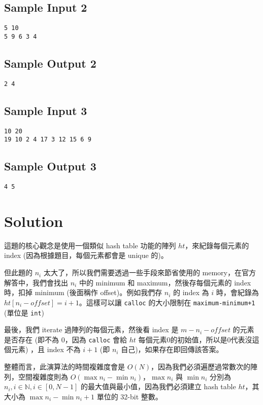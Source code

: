\documentclass[12pt]{article}
\begin{document}
\subsection{Sample Input 2}
\begin{verbatim}
5 10
5 9 6 3 4
\end{verbatim}
\subsection{Sample Output 2}
\begin{verbatim}    
2 4
\end{verbatim}
\subsection{Sample Input 3}
\begin{verbatim}
10 20
19 10 2 4 17 3 12 15 6 9
\end{verbatim}
\subsection{Sample Output 3}
\begin{verbatim}
4 5
\end{verbatim}
\section{Solution}
這題的核心觀念是使用一個類似 hash table 功能的陣列 $ht$，來紀錄每個元素的 index (因為根據題目，每個元素都會是 unique 的)。

但此題的 $n_i$ 太大了，所以我們需要透過一些手段來節省使用的 memory，在官方解答中，我們會找出 $n_i$ 中的 minimum 和 maximum，然後存每個元素的 index 時，扣掉 minimum (後面稱作 offset)。例如我們存 $n_i$ 的 index 為 $i$ 時，會紀錄為 $ht[n_i-offset]=i+1$。這樣可以讓 \texttt{calloc} 的大小限制在 \texttt{maximum-minimum+1} (單位是 \texttt{int})

最後，我們 iterate 過陣列的每個元素，然後看 index 是 $m-n_i-offset$ 的元素是否存在 (即不為 $0$，因為 \texttt{calloc} 會給 $ht$ 每個元素0的初始值，所以是0代表沒這個元素) ，且 index 不為 $i+1$ (即 $n_i$ 自己)，如果存在即回傳該答案。

整體而言，此演算法的時間複雜度會是 $O(N)$，因為我們必須遍歷過常數次的陣列，空間複雜度則為 $O(\max{n_i}-\min{n_i})$，$\max{n_i}$ 與 $\min{n_i}$ 分別為 $n_i,i\in\mathbb{N},i\in[0,N-1]$ 的最大值與最小值，因為我們必須建立 hash table $ht$，其大小為 $\max{n_i}-\min{n_i}+1$ 單位的 32-bit 整數。
\end{document}
